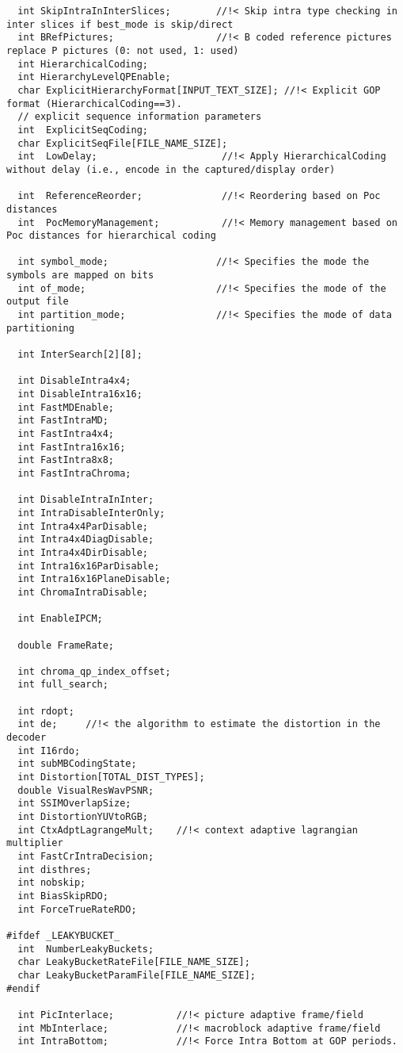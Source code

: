 \begin{lstlisting}
  int SkipIntraInInterSlices;        //!< Skip intra type checking in inter slices if best_mode is skip/direct
  int BRefPictures;                  //!< B coded reference pictures replace P pictures (0: not used, 1: used)
  int HierarchicalCoding;
  int HierarchyLevelQPEnable;
  char ExplicitHierarchyFormat[INPUT_TEXT_SIZE]; //!< Explicit GOP format (HierarchicalCoding==3).
  // explicit sequence information parameters
  int  ExplicitSeqCoding;
  char ExplicitSeqFile[FILE_NAME_SIZE];
  int  LowDelay;                      //!< Apply HierarchicalCoding without delay (i.e., encode in the captured/display order)

  int  ReferenceReorder;              //!< Reordering based on Poc distances
  int  PocMemoryManagement;           //!< Memory management based on Poc distances for hierarchical coding

  int symbol_mode;                   //!< Specifies the mode the symbols are mapped on bits
  int of_mode;                       //!< Specifies the mode of the output file
  int partition_mode;                //!< Specifies the mode of data partitioning

  int InterSearch[2][8];

  int DisableIntra4x4;
  int DisableIntra16x16;
  int FastMDEnable; 
  int FastIntraMD; 
  int FastIntra4x4;
  int FastIntra16x16;
  int FastIntra8x8;
  int FastIntraChroma;

  int DisableIntraInInter;
  int IntraDisableInterOnly;
  int Intra4x4ParDisable;
  int Intra4x4DiagDisable;
  int Intra4x4DirDisable;
  int Intra16x16ParDisable;
  int Intra16x16PlaneDisable;
  int ChromaIntraDisable;

  int EnableIPCM;

  double FrameRate;

  int chroma_qp_index_offset;
  int full_search;

  int rdopt;
  int de;     //!< the algorithm to estimate the distortion in the decoder
  int I16rdo; 
  int subMBCodingState;
  int Distortion[TOTAL_DIST_TYPES];
  double VisualResWavPSNR;
  int SSIMOverlapSize;
  int DistortionYUVtoRGB;
  int CtxAdptLagrangeMult;    //!< context adaptive lagrangian multiplier
  int FastCrIntraDecision;
  int disthres;
  int nobskip;
  int BiasSkipRDO;
  int ForceTrueRateRDO;

#ifdef _LEAKYBUCKET_
  int  NumberLeakyBuckets;
  char LeakyBucketRateFile[FILE_NAME_SIZE];
  char LeakyBucketParamFile[FILE_NAME_SIZE];
#endif

  int PicInterlace;           //!< picture adaptive frame/field
  int MbInterlace;            //!< macroblock adaptive frame/field
  int IntraBottom;            //!< Force Intra Bottom at GOP periods.


\end{lstlisting}
